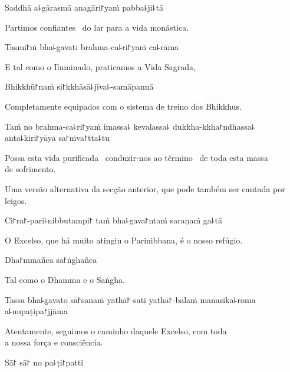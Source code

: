 Saddhā a꜕gārasmā anagāri꜓yaṁ pabba꜕ji꜕tā

\begin{english}
  Partimos confiantes \pause\ do lar para a vida monástica.
\end{english}

Tasmi꜓ṁ bha꜕gavati brahma-ca꜕ri꜓yaṁ ca꜕rāma

\begin{english}
  E tal como o Iluminado, praticamos a Vida Sagrada,
\end{english}

Bhikkhū꜓naṁ si꜓kkhāsā꜕jīva꜕-samāpannā

\begin{english}
  Completamente equipados com o sistema de treino dos Bhikkhus.
\end{english}

\clearpage

Taṁ no brahma-ca꜕ri꜓yaṁ imassa꜕ kevalassa꜕ dukkha-kkha꜓ndhassa꜕ anta꜕kiri꜓yāya sa꜓ṁva꜓tta꜕tu

\begin{english}
  Possa esta vida purificada \pause\ conduzir-nos ao término \pause\ de toda esta massa\\ de sofrimento.
\end{english}

\begin{instruction}
  Uma versão alternativa da secção anterior, que pode também ser cantada por leigos.
\end{instruction}

Ci꜓ra꜓-pari꜕nibbutampi꜓ taṁ bha꜕gava꜓ntaṁ saraṇaṁ ga꜕tā

\begin{english}
  O Excelso, que há muito atingiu o Parinibbana, é o nosso refúgio.
\end{english}

Dha꜓mmañca sa꜓ṅghañca

\begin{english}
  Tal como o Dhamma e o Saṅgha.
\end{english}

Tassa bha꜕gavato sā꜓sanaṁ yathā꜓-sati yathā꜓-balaṁ manasika꜕roma a꜕nupaṭipa꜓jjāma

\begin{english}
  Atentamente, seguimos o caminho daquele Excelso, com toda\\ a nossa força e consciência.
\end{english}

Sā꜓ sā꜓ no pa꜕ṭi꜓patti

